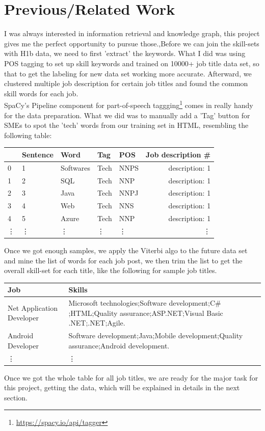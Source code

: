 \section{Previous/Related Work}
I was always interested in  information retrieval  and knowledge graph, this project gives me the perfect opportunity to pursue those.,Before we can join the skill-sets with H1b data, we need to first 'extract' the keywords.  What I did was using POS tagging to set up skill keywords and trained on 10000+  job title data set, so that to get the labeling for new data set working more accurate. Afterward, we clustered multiple job description for certain job titles and found the common  skill words for each job. \\ 
SpaCy's Pipeline component for part-of-speech taggging\footnote{\url {https://spacy.io/api/tagger}} comes in  really handy for the  data preparation. What we did was to manually add a 'Tag' button for SMEs to spot the 'tech' words from our training set in HTML, resembling the following table:
{
	\begin{center}
		\begin{tabular}{| l | l | l | l | l | r| } 
			\hline
			&	Sentence	&	Word	&	Tag	 & POS &	Job description \# \\ \hline
			0	&	1	&	Softwares		&Tech	& NNPS	&description: 1 \\ \hline
			1	&	2	&	SQL	&	Tech	& NNP &	description: 1 \\ \hline
			2	&	3	&	Java	&	Tech & NNPJ	&	description: 1	\\ \hline
			3		&4		&Web	&	Tech	& NNS&	description: 1\\ \hline
			4	&	5	&	Azure		&Tech	& NNP	&description: 1\\ \hline
			\vdots	&		\vdots	&		\vdots		&	\vdots	&	\vdots	&	\vdots\\ \hline
		\end{tabular}
\end{center}}
Once we got enough samples, we apply the Viterbi algo to the future data set and mine the list of words for each job post, we then trim the list to get the overall skill-set for each title, like the following for sample job titles.  

\begin{center}
	\begin{tabular}{ | p{2.5cm} |p{4.5cm} |}
		\hline
		Job & Skills \\ \hline
		Net Application Developer& Microsoft technologies;Software development;C$\#$;HTML;Quality assurance;ASP.NET;Visual Basic .NET;.NET;Agile.\\\hline
		Android Developer	& Software development;Java;Mobile development;Quality assurance;Android development.\\\hline
		\vdots	&	\vdots\\ \hline
	\end{tabular}
\end{center}
Once we got the whole table for all job titles, we are ready for the major task for this project, getting the data, which will be explained in details in the next section.

